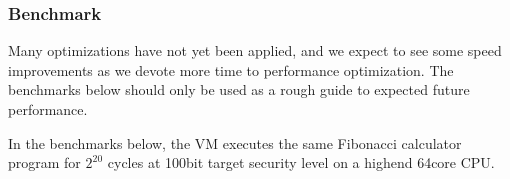 \subsubsection{Benchmark}\label{section: starky-benchmark}

Many optimizations have not yet been applied, and we expect to see some speed improvements as we devote more time to performance optimization. The benchmarks below should only be used as a rough guide to expected future performance.

In the benchmarks below, the VM executes the same Fibonacci calculator program for $2^{20}$ cycles at 100\-bit target security level on a high\-end 64\-core CPU.

\begin{table}[!ht]
    \centering {}
\end{table}